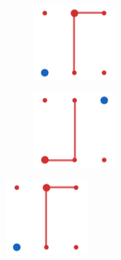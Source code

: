 \documentclass[14pt, a4paper]{extreport}
\begin{document}
\vspace{0.7cm}
\begin{figure}[H]
    \centering
    \begin{subfigure}{0.4\textwidth}
        \centering
        \includegraphics[scale=0.7]{./squeezes/double_R.png}
    \end{subfigure}
    \begin{subfigure}{0.4\textwidth}
        \centering
        \includegraphics[scale=0.7]{./squeezes/double_R_reverted.png}
    \end{subfigure}
\end{figure}

\handdiagramv
        {}
        {}
        {}
        {}
        {}

\vspace{0.3cm}

\hspace{6.3cm}\hspace{0.4cm}\hspace{0.4cm}
\vspace{-0.5cm}
\begin{figure}[H]
    \centering
    \includegraphics[scale=0.7]{./squeezes/double_R.png}
\end{figure}
\vspace{-0.9cm}
\hspace{6.3cm}\hspace{0.4cm}\hspace{0.4cm} 
\end{document}
